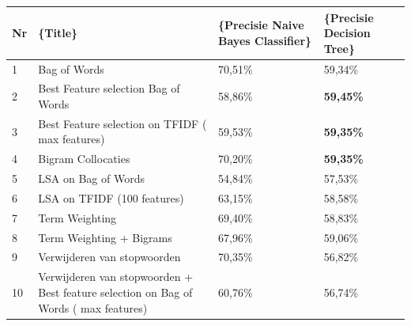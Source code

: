 \begin{table}[h]
\centering
\begin{adjustbox}{width=1\textwidth}
\begin{tabular}{|l|l|l|l|}
\hline
{\bf Nr} & {\bf \{\bf Title\}}                                                                  & \{\bf Precisie Naive Bayes Classifier\} & \{\bf Precisie Decision Tree\} \\ \hline
1        & Bag of Words                                                                         & 70,51\%                                 & 59,34\%                        \\ \hline
2        & Best Feature selection Bag of Words                                                  & 58,86\%                                 & {\bf 59,45\%}                  \\ \hline
3        & Best Feature selection on TFIDF ( max features)                                      & 59,53\%                                 & {\bf 59,35\%}                  \\ \hline
4        & Bigram Collocaties                                                                   & 70,20\%                                 & {\bf 59,35\%}                  \\ \hline
5        & LSA on Bag of Words                                                                  & 54,84\%                                 & 57,53\%                        \\ \hline
6        & LSA on TFIDF (100 features)                                                          & 63,15\%                                 & 58,58\%                        \\ \hline
7        & Term Weighting                                                                       & 69,40\%                                 & 58,83\%                        \\ \hline
8        & Term Weighting + Bigrams                                                             & 67,96\%                                 & 59,06\%                        \\ \hline
9        & Verwijderen van stopwoorden                                                          & 70,35\%                                 & 56,82\%                        \\ \hline
10        & Verwijderen van stopwoorden + Best feature selection on Bag of Words ( max features) & 60,76\%                                 & 56,74\%                        \\ \hline

\end{tabular}
\end{adjustbox}
\end{table}
